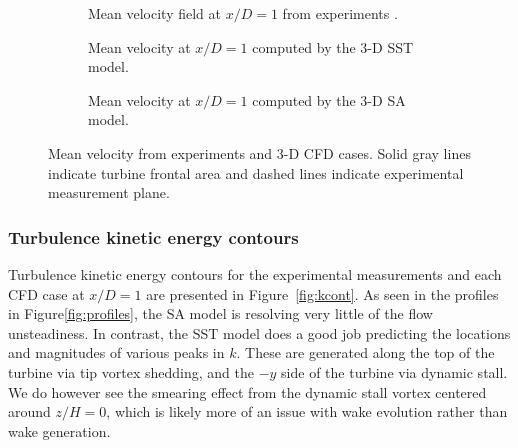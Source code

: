 \begin{figure}
    \centering
    \begin{subfigure}[b]{\textwidth}
       \centering


       \caption{Mean velocity field at $x/D=1$ from experiments
           \cite{Bachant2015-RVAT-Re-dep-data}.}

       \label{fig:meancontquiv-exp}
   \end{subfigure}

   \begin{subfigure}[b]{\textwidth}
       \centering


       \caption{Mean velocity at $x/D=1$ computed by the 3-D SST model.}

       \label{fig:meancontquiv-SST}
   \end{subfigure}

   \begin{subfigure}[b]{\textwidth}
       \centering


       \caption{Mean velocity at $x/D=1$ computed by the 3-D SA model.}

       \label{fig:meancontquiv-SA}
   \end{subfigure}

    \caption{Mean velocity from experiments and 3-D CFD cases. Solid gray lines
        indicate turbine frontal area and dashed lines indicate experimental
        measurement plane.}

    \label{fig:mean-velocity}
\end{figure}


\subsubsection{Turbulence kinetic energy contours}

Turbulence kinetic energy contours for the experimental measurements and each
CFD case at $x/D=1$ are presented in Figure~\ref{fig:kcont}. As seen in the
profiles in Figure\ref{fig:profiles}, the SA model is resolving very little of
the flow unsteadiness. In contrast, the SST model does a good job predicting the
locations and magnitudes of various peaks in $k$. These are generated along the
top of the turbine via tip vortex shedding, and the $-y$ side of the turbine via
dynamic stall. We do however see the smearing effect from the dynamic stall
vortex centered around $z/H=0$, which is likely more of an issue with wake
evolution rather than wake generation.

